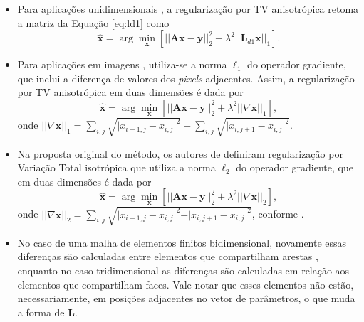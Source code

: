 \begin{itemize}
\item Para aplicações unidimensionais \cite[pág. 195]{aster2019parameter}, a regularização por TV anisotrópica retoma a matriz da Equação \eqref{eq:ld1} como 
\begin{equation}
\hat{\mathbf{x}} = \arg\min\limits_{\mathbf{x}} \left[ \vert \vert \mathbf{A} \mathbf{x} - \mathbf{y} \vert \vert^2_2 + \lambda^2 \vert \vert \mathbf{L}_{d1} \mathbf{x} \vert \vert_1 \right].
\label{eq:TV11d1}
\end{equation}
\item Para aplicações em imagens \cite[págs. 195-6]{aster2019parameter}, utiliza-se a norma $\ell_1$ do operador gradiente, que inclui a diferença de valores dos \textit{pixels} adjacentes. Assim, a regularização por TV anisotrópica em duas dimensões é dada por 
\begin{equation}
\hat{\mathbf{x}} = \arg\min\limits_{\mathbf{x}} \left[ \vert \vert \mathbf{A} \mathbf{x} - \mathbf{y} \vert \vert^2_2 + \lambda^2 \vert \vert \nabla \mathbf{x} \vert \vert_1 \right],
\label{eq:TV11d3}
\end{equation}
onde $ \vert \vert \nabla \mathbf{x} \vert \vert_1 = \sum _{i,j} \sqrt{\vert x_{i+1,j}-x_{i,j}\vert^{2}} + \sum_{i,j} \sqrt{\vert x_{i,j+1}-x_{i,j}\vert^{2}}$.

\item Na proposta original do método, os autores de \cite{Rudin1992} definiram regularização por Variação Total isotrópica que utiliza a norma $\ell_2$ do operador gradiente, que em duas dimensões é dada por 
\begin{equation}
\hat{\mathbf{x}} = \arg\min\limits_{\mathbf{x}} \left[ \vert \vert \mathbf{A} \mathbf{x} - \mathbf{y} \vert \vert^2_2 + \lambda^2 \vert \vert \nabla \mathbf{x} \vert \vert_2 \right],
\label{eq:TV11d4}
\end{equation}
onde $ \vert \vert \nabla \mathbf{x} \vert \vert_2 = \sum _{i,j}{\sqrt {\vert x_{i+1,j}-x_{i,j}\vert^{2}+\vert x_{i,j+1}-x_{i,j}\vert^{2}}}$, conforme \cite[pág. 195]{aster2019parameter}. 

\item No caso de uma malha de elementos finitos bidimensional, novamente essas diferenças são calculadas entre elementos que compartilham arestas \cite{Borsic2010}, enquanto no caso tridimensional as diferenças são calculadas em relação aos elementos que compartilham faces. Vale notar que esses elementos não estão, necessariamente, em posições adjacentes no vetor de parâmetros, o que muda a forma de $\mathbf{L}$. 
\end{itemize}

